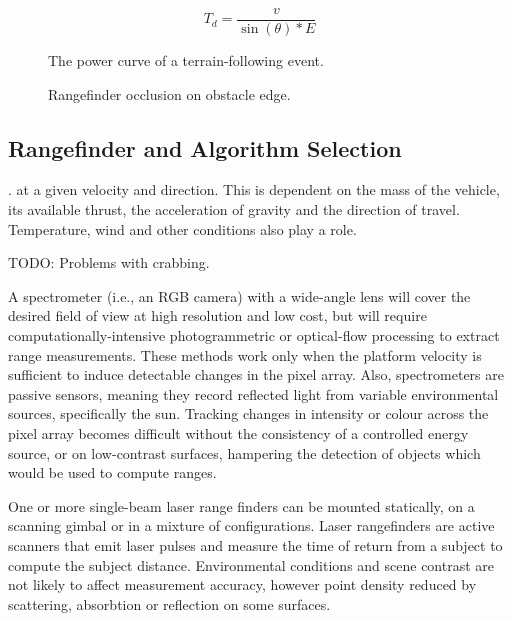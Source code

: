 \documentclass[10pt,a4paper]{report}
\begin{document}
\begin{equation}
T_d = \dfrac{v}{\sin(\theta) * E}
\label{eq:decel}
\end{equation} 

\begin{figure}
\centering
\def\svgscale{0.8}

\caption{The power curve of a terrain-following event.}
\label{fig:uav_power_curve}
\end{figure}


\begin{figure}
\centering
\def\svgscale{0.8}

\caption{Rangefinder occlusion on obstacle edge.}
\label{fig:uav_edge_occlude}
\end{figure}

\subsection{Rangefinder and Algorithm Selection}


.  at a given velocity and direction. This is dependent on the mass of the vehicle, its available thrust, the acceleration of gravity and the direction of travel. Temperature, wind and other conditions also play a role. 

TODO: Problems with crabbing.

A spectrometer (i.e., an RGB camera) with a wide-angle lens will cover the desired field of view at high resolution and low cost, but will require computationally-intensive photogrammetric or optical-flow processing to extract range measurements. These methods work only when the platform velocity is sufficient to induce detectable changes in the pixel array. Also, spectrometers are passive sensors, meaning they record reflected light from variable environmental sources, specifically the sun. Tracking changes in intensity or colour across the pixel array becomes difficult without the consistency of a controlled energy source, or on low-contrast surfaces, hampering the detection of objects which would be used to compute ranges.

One or more single-beam laser range finders can be mounted statically, on a scanning gimbal or in a mixture of configurations. Laser rangefinders are active scanners that emit laser pulses and measure the time of return from a subject to compute the subject distance. Environmental conditions and scene contrast are not likely to affect measurement accuracy, however point density reduced by scattering, absorbtion or reflection on some surfaces. 
\end{document}

